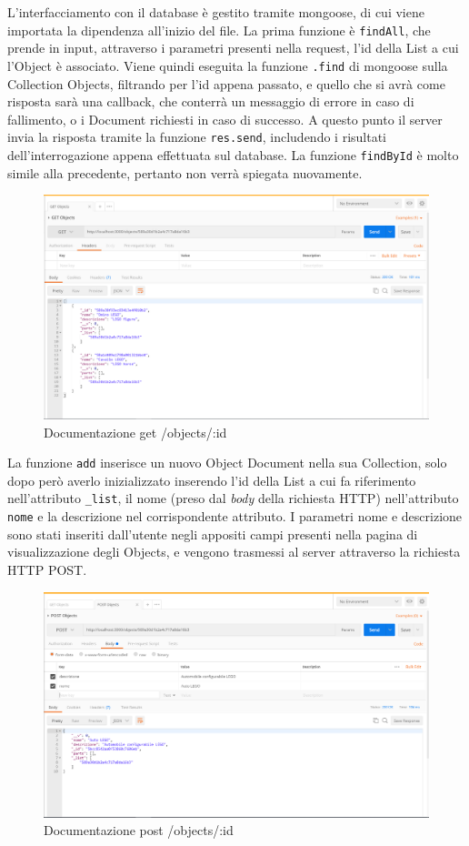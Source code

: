 L'interfacciamento con il database è gestito tramite mongoose, di cui viene importata la dipendenza all'inizio del file.
La prima funzione è \texttt{findAll}, che prende in input, attraverso i parametri presenti nella request, l'id della List a cui l'Object è associato. Viene quindi eseguita la funzione \texttt{.find} di mongoose sulla Collection Objects, filtrando per l'id appena passato, e quello che si avrà come risposta sarà una callback, che conterrà un messaggio di errore in caso di fallimento, o i Document richiesti in caso di successo. A questo punto il server invia la risposta tramite la funzione \texttt{res.send}, includendo i risultati dell'interrogazione appena effettuata sul database. La funzione \texttt{findById} è molto simile alla precedente, pertanto non verrà spiegata nuovamente.
\begin{figure}[h]
	\centering
	\includegraphics[scale=0.42]{Immagini/get_objects.png}
	\caption{Documentazione get /objects/:id}
\end{figure}

La funzione \texttt{add} inserisce un nuovo Object Document nella sua Collection, solo dopo però averlo inizializzato inserendo l'id della List a cui fa riferimento nell'attributo \texttt{\_list}, il nome (preso dal \emph{body} della richiesta HTTP) nell'attributo \texttt{nome} e la descrizione nel corrispondente attributo. I parametri nome e descrizione sono stati inseriti dall'utente negli appositi campi presenti nella pagina di visualizzazione degli Objects, e vengono trasmessi al server attraverso la richiesta HTTP POST.
\begin{figure}[h]
	\centering
	\includegraphics[scale=0.42]{Immagini/post_objects.png}
	\caption{Documentazione post /objects/:id}
\end{figure}

